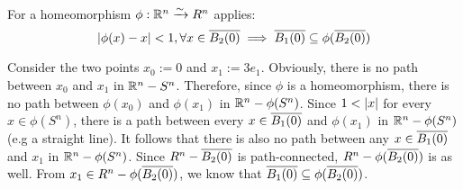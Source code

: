  \\
For a homeomorphism $\phi: \mathbb{R}^n \xrightarrow{\sim} R^n$ applies:
\[ \abs{\phi(x) - x} < 1, \forall x \in \clball[2] \implies \clball[1] \sub \phi(\clball[2]) \]
\begin{myproof}
Consider the two points $x_0 := 0$ and $x_1 := 3e_1$.
Obviously, there is no path between $x_0$ and $x_1$ in $\mathbb{R}^n - S^n$.
Therefore, since $\phi$ is a homeomorphism, there is no path between $\phi(x_0)$ and $\phi(x_1)$ in $\mathbb{R}^n - \phi(S^n)$.
Since $1 < \vert{} x \vert{}$ for every $x \in\phi(S^n)$, there is a path between every $x \in \clball[1]$ and $\phi(x_1)$ in $\mathbb{R}^n - \phi(S^n)$ (e.g a straight line).
It follows that there is also no path between any $x \in \clball[1]$ and $x_1$ in $\mathbb{R}^n - \phi(S^n)$.
Since $R^n - \clball[2]$ is path-connected, $R^n - \phi(\clball[2])$ is as well. From $x_1 \in R^n - \phi(\clball[2])$, we know that $\clball[1] \sub \phi(\clball[2])$.
\end{myproof}

